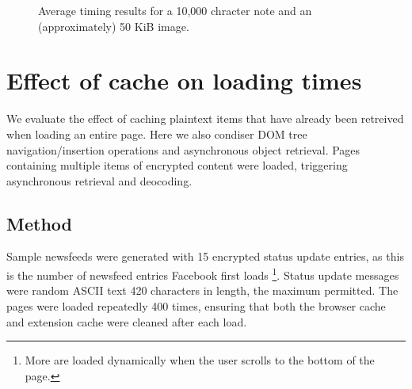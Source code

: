 \begin{figure}[tbph]
    \begin{center}
    \caption{Average timing results for a 10,000 chracter note and an (approximately) 50 KiB image.}
    \label{graph:txt-sync}
  \end{center}
\end{figure}













\section{Effect of cache on loading times}

We evaluate the effect of caching plaintext items that have already been retreived when loading an entire page. Here we also condiser DOM tree navigation/insertion operations and asynchronous object retrieval. Pages containing multiple items of encrypted content were loaded, triggering asynchronous retrieval and deocoding.


\subsection{Method}

Sample newsfeeds were generated with 15 encrypted status update entries, as this is the number of newsfeed entries Facebook first loads \footnote{More are loaded dynamically when the user scrolls to the bottom of the page.}. Status update messages were random ASCII text 420 characters in length, the maximum permitted. The pages were loaded repeatedly 400 times, ensuring that both the browser cache and extension cache were cleaned after each load.


